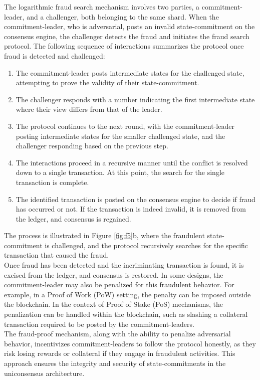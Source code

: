 \documentclass{report}
\begin{document}
\begin{enumerate}
	The logarithmic fraud search mechanism involves two parties, a commitment-leader, and a challenger, both belonging to the same shard. When the commitment-leader, who is adversarial, posts an invalid state-commitment on the consensus engine, the challenger detects the fraud and initiates the fraud search protocol. The following sequence of interactions summarizes the protocol once fraud is detected and challenged:\\
	\begin{enumerate}
		\item The commitment-leader posts intermediate states for the challenged state, attempting to prove the validity of their state-commitment.
		\item The challenger responds with a number indicating the first intermediate state where their view differs from that of the leader.
		\item The protocol continues to the next round, with the commitment-leader posting intermediate states for the smaller challenged state, and the challenger responding based on the previous step.
		\item The interactions proceed in a recursive manner until the conflict is resolved down to a single transaction. At this point, the search for the single transaction is complete.
		\item The identified transaction is posted on the consensus engine to decide if fraud has occurred or not. If the transaction is indeed invalid, it is removed from the ledger, and consensus is regained.
	\end{enumerate}
	The process is illustrated in Figure \ref{fig:f5}b, where the fraudulent state-commitment is challenged, and the protocol recursively searches for the specific transaction that caused the fraud.\\
	Once fraud has been detected and the incriminating transaction is found, it is excised from the ledger, and consensus is restored. In some designs, the commitment-leader may also be penalized for this fraudulent behavior. For example, in a Proof of Work (PoW) setting, the penalty can be imposed outside the blockchain. In the context of Proof of Stake (PoS) mechanisms, the penalization can be handled within the blockchain, such as slashing a collateral transaction required to be posted by the commitment-leaders.\\
	The fraud-proof mechanism, along with the ability to penalize adversarial behavior, incentivizes commitment-leaders to follow the protocol honestly, as they risk losing rewards or collateral if they engage in fraudulent activities. This approach ensures the integrity and security of state-commitments in the uniconsensus architecture.
\end{enumerate} 
\end{document}
